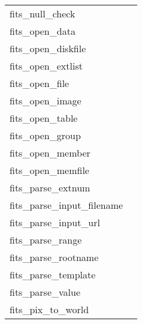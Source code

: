 \documentclass[11pt]{book}
\begin{document}
\begin{tabular}{lr}
fits\_null\_check     & \pageref{ffnchk} \\
fits\_open\_data      & \pageref{ffopen} \\
fits\_open\_diskfile    & \pageref{ffopen} \\
fits\_open\_extlist      & \pageref{ffopen} \\
fits\_open\_file      & \pageref{ffopen} \\
fits\_open\_image      & \pageref{ffopen} \\
fits\_open\_table      & \pageref{ffopen} \\
fits\_open\_group    & \pageref{ffgtop} \\
fits\_open\_member    & \pageref{ffgmop} \\
fits\_open\_memfile   & \pageref{ffomem} \\
fits\_parse\_extnum   & \pageref{ffextn} \\
fits\_parse\_input\_filename & \pageref{ffiurl} \\
fits\_parse\_input\_url & \pageref{ffiurl} \\
fits\_parse\_range    & \pageref{ffrwrg} \\
fits\_parse\_rootname & \pageref{ffrtnm} \\
fits\_parse\_template & \pageref{ffgthd} \\
fits\_parse\_value    & \pageref{ffpsvc} \\
fits\_pix\_to\_world & \pageref{ffwldp} \\
\end{tabular}
\end{document}
